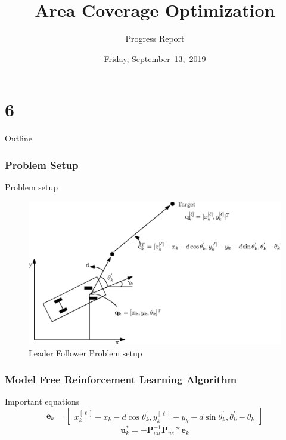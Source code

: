 \documentclass{beamer}
\begin{document}
\part{6}
\title{Area Coverage Optimization}
\subtitle{Progress Report}
\date[Sep~13,~2019]{Friday, September~13,~2019}
\begin{frame}
\maketitle
\end{frame}
\begin{frame}{Outline}
  \tableofcontents
  \end{frame}
\section{Problem Setup}
\begin{frame}{Problem setup}
\begin{center}
\begin{figure}
\includegraphics[scale=0.8]{figs/img/LF-Setup.eps}
\caption{Leader Follower Problem setup}
\end{figure}
\end{center}
\end{frame}
\section{Model Free Reinforcement Learning Algorithm} 
\begin{frame}{Important equations}
\begin{equation}
\mathbf{e}_k = \begin{bmatrix}
     x_k^{[\ell]} - x_k - d\cos\theta_k^{'},
    y_k^{[\ell]} - y_k - d\sin\theta_k^{'},
    \theta_k^{'} - \theta_k
  \end{bmatrix}
\end{equation} 
\begin{equation}
\mathbf{u}_k^*  = - \mathbf{P}_{uu}^{-1}\mathbf{P}_{ue}*\mathbf{e}_k
\end{equation}

\end{frame}
\end{document}
